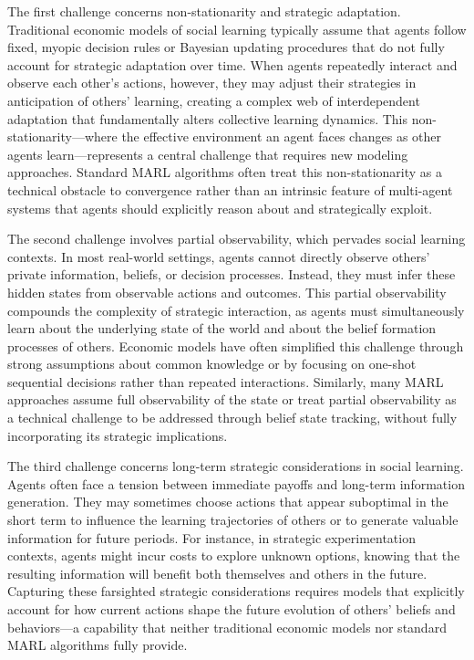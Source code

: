 The first challenge concerns non-stationarity and strategic adaptation. Traditional economic models of social learning typically assume that agents follow fixed, myopic decision rules or Bayesian updating procedures that do not fully account for strategic adaptation over time. When agents repeatedly interact and observe each other's actions, however, they may adjust their strategies in anticipation of others' learning, creating a complex web of interdependent adaptation that fundamentally alters collective learning dynamics. This non-stationarity—where the effective environment an agent faces changes as other agents learn—represents a central challenge that requires new modeling approaches. Standard MARL algorithms often treat this non-stationarity as a technical obstacle to convergence rather than an intrinsic feature of multi-agent systems that agents should explicitly reason about and strategically exploit.

The second challenge involves partial observability, which pervades social learning contexts. In most real-world settings, agents cannot directly observe others' private information, beliefs, or decision processes. Instead, they must infer these hidden states from observable actions and outcomes. This partial observability compounds the complexity of strategic interaction, as agents must simultaneously learn about the underlying state of the world and about the belief formation processes of others. Economic models have often simplified this challenge through strong assumptions about common knowledge or by focusing on one-shot sequential decisions rather than repeated interactions. Similarly, many MARL approaches assume full observability of the state or treat partial observability as a technical challenge to be addressed through belief state tracking, without fully incorporating its strategic implications.

The third challenge concerns long-term strategic considerations in social learning. Agents often face a tension between immediate payoffs and long-term information generation. They may sometimes choose actions that appear suboptimal in the short term to influence the learning trajectories of others or to generate valuable information for future periods. For instance, in strategic experimentation contexts, agents might incur costs to explore unknown options, knowing that the resulting information will benefit both themselves and others in the future. Capturing these farsighted strategic considerations requires models that explicitly account for how current actions shape the future evolution of others' beliefs and behaviors—a capability that neither traditional economic models nor standard MARL algorithms fully provide.


